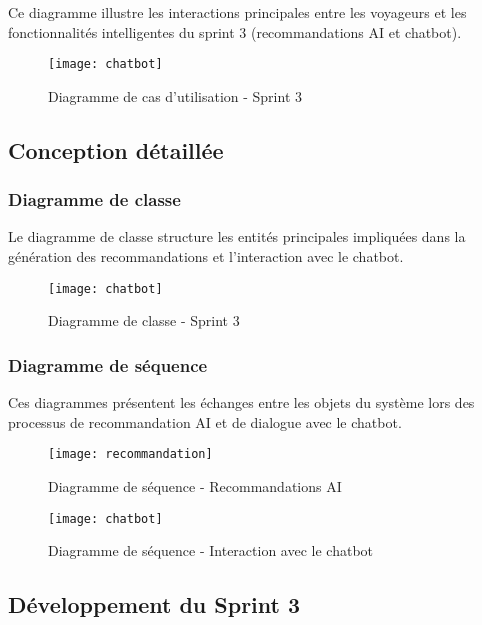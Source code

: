 Ce diagramme illustre les interactions principales entre les voyageurs et les fonctionnalités intelligentes du sprint 3 
(recommandations AI et chatbot).

\begin{figure}[H]
    \centering
    \texttt{[image: chatbot]}
    \caption{Diagramme de cas d'utilisation - Sprint 3}
\end{figure}

\subsection{Conception détaillée}

\subsubsection{Diagramme de classe}

Le diagramme de classe structure les entités principales impliquées dans la génération des recommandations 
et l’interaction avec le chatbot.

\begin{figure}[H]
    \centering
    \texttt{[image: chatbot]}
    \caption{Diagramme de classe - Sprint 3}
\end{figure}

\subsubsection{Diagramme de séquence}

Ces diagrammes présentent les échanges entre les objets du système lors des processus de recommandation AI 
et de dialogue avec le chatbot.

\begin{figure}[H]
    \centering
    \texttt{[image: recommandation]}
    \caption{Diagramme de séquence - Recommandations AI}
    
    \centering
    \texttt{[image: chatbot]}
    \caption{Diagramme de séquence - Interaction avec le chatbot}
\end{figure}

\subsection{Développement du Sprint 3}

